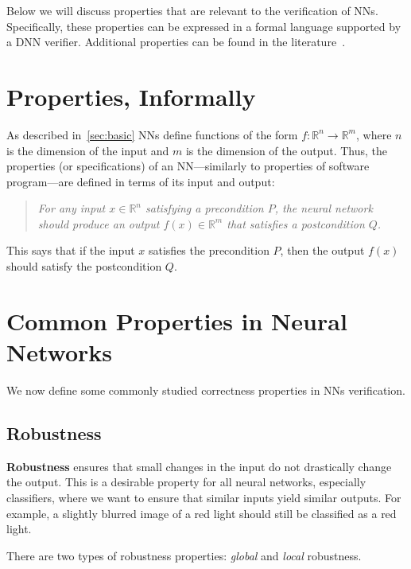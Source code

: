 \documentclass[oneside,11pt,dvipsnames]{book}
\numberwithin{equation}{section}
\theoremstyle{definition}
\theoremstyle{remark}
\newcommand{\tvn}[1]{\iftoggle{usecomment}{{\color{red}{[TVN]: #1}}}{}}
\begin{document}
Below we will discuss properties that are relevant to the verification of NNs. Specifically, these properties can be 
expressed in a formal language supported by a DNN verifier. Additional properties can be found in the literature~\cite{seshia2018formal}.

\section{Properties, Informally}

As described in~\autoref{sec:basic} NNs define functions of the form $f: \mathbb{R}^{n} \to \mathbb{R}^{m}$, 
where $n$ is the dimension of the input and $m$ is the dimension of the output. Thus, the properties (or specifications) of an NN---similarly to properties of software program---are defined in terms of its input and output:

\begin{quote}
\textit{For any input $x \in \mathbb{R}^{n}$ satisfying a precondition $P$, the neural network should produce an output $f(x) \in \mathbb{R}^{m}$ that satisfies a postcondition $Q$.}
\end{quote}

This says that if the input $x$ satisfies the precondition $P$, then the output $f(x)$ should satisfy the postcondition $Q$.






\section{Common Properties in Neural Networks}

We now define some commonly studied correctness properties in NNs verification.

\subsection{Robustness}

\textbf{Robustness} ensures that small changes in the input do not drastically change the output. This is a desirable property for all neural networks, especially classifiers, where we want to ensure that similar inputs yield similar outputs. For example, a slightly blurred image of a red light should still be classified as a red light.

There are two types of robustness properties: \emph{global} and \emph{local} robustness. \tvn{hai, define these two for DNN verification.  Also in DNN verification do you distinctly distinguish between global and local robustness? }
\end{document}
